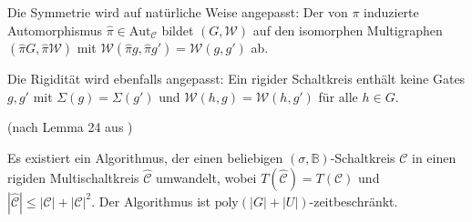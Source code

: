 Die Symmetrie wird auf natürliche Weise angepasst: Der von $\pi$
induzierte Automorphismus $\hat{\pi}\in\mathrm{Aut}_{\mathcal{C}}$
bildet $\left(G,\mathcal{W}\right)$ auf den isomorphen Multigraphen
$\left(\hat{\pi}G,\hat{\pi}\mathcal{W}\right)$ mit $\mathcal{W}\left(\hat{\pi}g,\hat{\pi}g'\right)=\mathcal{W}\left(g,g'\right)$
ab.

Die Rigidität wird ebenfalls angepasst: Ein rigider Schaltkreis enthält
keine Gates $g,g'$ mit $\Sigma\left(g\right)=\Sigma\left(g'\right)$
und $\mathcal{W}\left(h,g\right)=\mathcal{W}\left(h,g'\right)$ für
alle $h\in G$.
\begin{lem}
\label{lem:algo-rigid}(nach Lemma 24 aus \cite{AD2014})

Es existiert ein Algorithmus, der einen beliebigen $\left(\sigma,\mathbb{B}\right)$-Schaltkreis
$\mathcal{C}$ in einen rigiden Multischaltkreis $\hat{\mathcal{C}}$
umwandelt, wobei $T\left(\hat{\mathcal{C}}\right)=T\left(\mathcal{C}\right)$
und $\left|\hat{\mathcal{C}}\right|\leqslant\left|\mathcal{C}\right|+\left|\mathcal{C}\right|^{2}$.
Der Algorithmus ist $\mathrm{poly}\left(\left|G\right|+\left|U\right|\right)$-zeitbeschränkt.
\end{lem}

